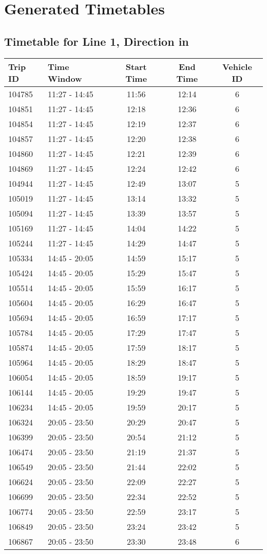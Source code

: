 \documentclass{article}
\begin{document}
            \section*{Generated Timetables}
            \subsection*{Timetable for Line 1, Direction in}
\begin{tabular}{llccc}
\toprule
Trip ID & Time Window & Start Time & End Time & Vehicle ID \\
\midrule
104785 & 11:27 - 14:45 & 11:56 & 12:14 & 6 \\
104851 & 11:27 - 14:45 & 12:18 & 12:36 & 6 \\
104854 & 11:27 - 14:45 & 12:19 & 12:37 & 6 \\
104857 & 11:27 - 14:45 & 12:20 & 12:38 & 6 \\
104860 & 11:27 - 14:45 & 12:21 & 12:39 & 6 \\
104869 & 11:27 - 14:45 & 12:24 & 12:42 & 6 \\
104944 & 11:27 - 14:45 & 12:49 & 13:07 & 5 \\
105019 & 11:27 - 14:45 & 13:14 & 13:32 & 5 \\
105094 & 11:27 - 14:45 & 13:39 & 13:57 & 5 \\
105169 & 11:27 - 14:45 & 14:04 & 14:22 & 5 \\
105244 & 11:27 - 14:45 & 14:29 & 14:47 & 5 \\
105334 & 14:45 - 20:05 & 14:59 & 15:17 & 5 \\
105424 & 14:45 - 20:05 & 15:29 & 15:47 & 5 \\
105514 & 14:45 - 20:05 & 15:59 & 16:17 & 5 \\
105604 & 14:45 - 20:05 & 16:29 & 16:47 & 5 \\
105694 & 14:45 - 20:05 & 16:59 & 17:17 & 5 \\
105784 & 14:45 - 20:05 & 17:29 & 17:47 & 5 \\
105874 & 14:45 - 20:05 & 17:59 & 18:17 & 5 \\
105964 & 14:45 - 20:05 & 18:29 & 18:47 & 5 \\
106054 & 14:45 - 20:05 & 18:59 & 19:17 & 5 \\
106144 & 14:45 - 20:05 & 19:29 & 19:47 & 5 \\
106234 & 14:45 - 20:05 & 19:59 & 20:17 & 5 \\
106324 & 20:05 - 23:50 & 20:29 & 20:47 & 5 \\
106399 & 20:05 - 23:50 & 20:54 & 21:12 & 5 \\
106474 & 20:05 - 23:50 & 21:19 & 21:37 & 5 \\
106549 & 20:05 - 23:50 & 21:44 & 22:02 & 5 \\
106624 & 20:05 - 23:50 & 22:09 & 22:27 & 5 \\
106699 & 20:05 - 23:50 & 22:34 & 22:52 & 5 \\
106774 & 20:05 - 23:50 & 22:59 & 23:17 & 5 \\
106849 & 20:05 - 23:50 & 23:24 & 23:42 & 5 \\
106867 & 20:05 - 23:50 & 23:30 & 23:48 & 6 \\
\bottomrule
\end{tabular}
\end{document}
